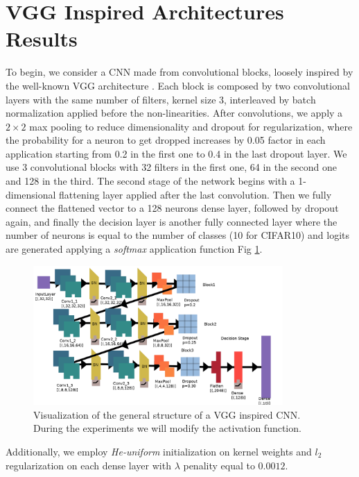 \documentclass[LaM,binding=0.6cm]{./packages/sapthesis/sapthesis}
\begin{document}
    \section{VGG Inspired Architectures Results}
        
        To begin, we consider a CNN made from convolutional blocks, loosely inspired by the well-known 
        VGG architecture \cite{vgg}. Each block is composed by two convolutional layers with the same 
        number of filters, kernel size 3, interleaved by batch normalization applied before the 
        non-linearities. After convolutions, we apply a $2\times2$ max pooling to reduce dimensionality 
        and dropout for regularization, where the probability for a neuron to get dropped increases
        by 0.05 factor in each application starting from 0.2 in the first one to 0.4 in the last dropout layer.
        We use 3 convolutional blocks with 32 filters in the first one, 64 in the second one and 128 in the third.
        The second stage of the network begins with a 1-dimensional flattening layer applied after the last convolution. 
        Then we fully connect the flattened vector to a 128 neurons dense layer, followed by dropout again,
        and finally the decision layer is another fully connected layer where the number of neurons is equal 
        to the number of classes (10 for CIFAR10) and logits are generated applying a \textit{softmax} application 
        function Fig \ref{fig:vgg}.
        \begin{figure}[h!]
            \centering
            \includegraphics[width=0.85\textwidth]{VGG_inspired_arch}
            \caption{Visualization of the general structure of a VGG inspired CNN. During the experiments
            we will modify the activation function.}
            \label{fig:vgg}
        \end{figure}
        Additionally, we employ \textit{He-uniform} initialization on kernel weights and 
        \textit{$l_2$} regularization on each dense layer with $\lambda$ penality equal to $0.0012$. 
        
\end{document}
